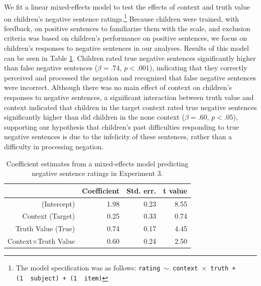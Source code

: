 \documentclass[man, noapacite]{apa2}
\begin{document}
We fit a linear mixed-effects model to test the effects of context and truth value on children's negative sentence ratings.\footnote{ The model specification was as follows: \texttt{rating $\sim$ context~$\times$~truth + (1~\textbar~subject) + (1~\textbar~item)}}  Because children were trained, with feedback, on positive sentences to familiarize them with the scale, and exclusion criteria was based on children's performance on positive sentences, we focus on children's responses to negative sentences in our analyses. Results of this model can be seen in Table \ref{tab:s3.1}. Children rated true negative sentences significantly higher than false negative sentences ($\beta= .74$, $p< .001$), indicating that they correctly perceived and processed the negation and recognized that false negative sentences were incorrect. Although there was no main effect of context on children's responses to negative sentences, a significant interaction between truth value and context indicated that children in the target context rated true negative sentences significantly higher than did children in the none context ($\beta= .60$, $p< .05$), supporting our hypothesis that children's past difficulties responding to true negative sentences is due to the infelicity of these sentences, rather than a difficulty in processing negation.

\begin{table}[t]
\caption{\label{tab:s3.1} Coefficient estimates from a mixed-effects model predicting negative sentence ratings in Experiment 3.}
\begin{center}
\small\addtolength{\tabcolsep}{-5pt}
\begin{tabular}{rrrr}
 \hline
 & Coefficient & Std. err. & t value \\
 \hline
(Intercept) & 1.98 & 0.23 & 8.55 \\
 Context (Target) & 0.25 & 0.33 & 0.74 \\
 Truth Value (True) & 0.74 & 0.17 & 4.45 \\
 Context$\times$Truth Value & 0.60 & 0.24 & 2.50 \\
  \hline
\end{tabular}
\end{center}
\end{table}
\end{document}
